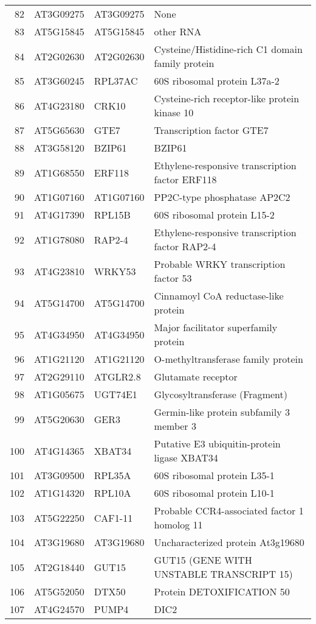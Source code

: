 \documentclass[a4paper]{article}
\begin{document}
\begin{center}
\begin{tabular}{rlll}
82 & AT3G09275 & AT3G09275 & None\\
83 & AT5G15845 & AT5G15845 & other RNA\\
84 & AT2G02630 & AT2G02630 & Cysteine/Histidine-rich C1 domain family protein\\
85 & AT3G60245 & RPL37AC & 60S ribosomal protein L37a-2\\
86 & AT4G23180 & CRK10 & Cysteine-rich receptor-like protein kinase 10\\
87 & AT5G65630 & GTE7 & Transcription factor GTE7\\
88 & AT3G58120 & BZIP61 & BZIP61\\
89 & AT1G68550 & ERF118 & Ethylene-responsive transcription factor ERF118\\
90 & AT1G07160 & AT1G07160 & PP2C-type phosphatase AP2C2\\
91 & AT4G17390 & RPL15B & 60S ribosomal protein L15-2\\
92 & AT1G78080 & RAP2-4 & Ethylene-responsive transcription factor RAP2-4\\
93 & AT4G23810 & WRKY53 & Probable WRKY transcription factor 53\\
94 & AT5G14700 & AT5G14700 & Cinnamoyl CoA reductase-like protein\\
95 & AT4G34950 & AT4G34950 & Major facilitator superfamily protein\\
96 & AT1G21120 & AT1G21120 & O-methyltransferase family protein\\
97 & AT2G29110 & ATGLR2.8 & Glutamate receptor\\
98 & AT1G05675 & UGT74E1 & Glycosyltransferase (Fragment)\\
99 & AT5G20630 & GER3 & Germin-like protein subfamily 3 member 3\\
100 & AT4G14365 & XBAT34 & Putative E3 ubiquitin-protein ligase XBAT34\\
101 & AT3G09500 & RPL35A & 60S ribosomal protein L35-1\\
102 & AT1G14320 & RPL10A & 60S ribosomal protein L10-1\\
103 & AT5G22250 & CAF1-11 & Probable CCR4-associated factor 1 homolog 11\\
104 & AT3G19680 & AT3G19680 & Uncharacterized protein At3g19680\\
105 & AT2G18440 & GUT15 & GUT15 (GENE WITH UNSTABLE TRANSCRIPT 15)\\
106 & AT5G52050 & DTX50 & Protein DETOXIFICATION 50\\
107 & AT4G24570 & PUMP4 & DIC2\\

\end{tabular}
\end{center}
\end{document}
